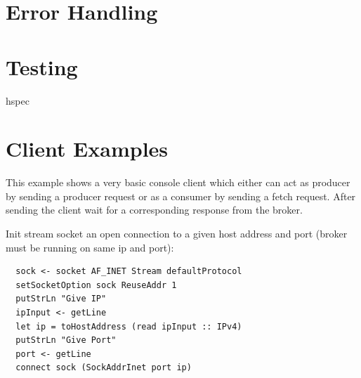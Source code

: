  






\section{Error Handling}

\section{Testing}
hspec 

\section{Client Examples}
This example shows a very basic console client which either can act as producer
by sending a producer request or as a consumer by sending a fetch request. After
sending the client wait for a corresponding response from the broker.

Init stream socket an open connection to a given host address and port (broker must be running on same ip and port): 
\begin{lstlisting}
  sock <- socket AF_INET Stream defaultProtocol 
  setSocketOption sock ReuseAddr 1
  putStrLn "Give IP"
  ipInput <- getLine
  let ip = toHostAddress (read ipInput :: IPv4)
  putStrLn "Give Port"
  port <- getLine
  connect sock (SockAddrInet port ip)
\end{lstlisting}

